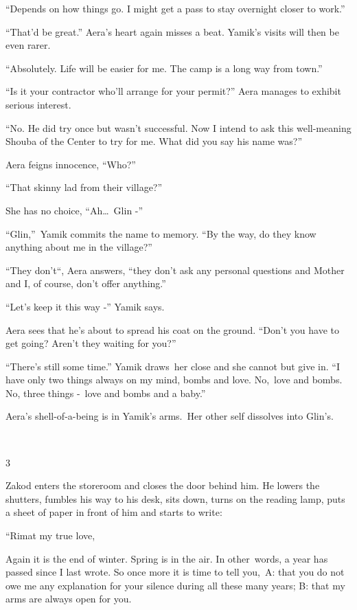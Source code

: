 \documentclass[twoside,11pt]{book}
\begin{document}
{}``Depends on how things go. I might get a pass to stay overnight closer to work.'' 

{}``That{}'d be great.'' Aera's heart again misses a beat. Yamik's visits will then be even rarer. 

{}``Absolutely. Life will be easier for me. The camp is a long way from town.'' 

{}``Is it your contractor who'll arrange for your permit?'' Aera manages to exhibit serious interest. 

{}``No. He did try once but wasn't successful. Now I intend to ask this well-meaning Shouba of the Center to try for me.
What did you say his name was?'' 

Aera feigns innocence, ``Who?''~ 

{}``That skinny lad from their village?'' 

She has no choice, ``Ah{\dots}\ Glin -{}'' 

{}``Glin,{}''\ Yamik commits the name to memory. ``By the way, do they know anything about me in the
village?''

``They don't``, Aera answers, ``they don't ask any personal questions and Mother
and I, of course, don't offer anything.''

``Let's keep it this way -'' Yamik says.

Aera sees that he's about to spread his coat on the ground. ``Don't you have to get going? Aren't they waiting for
you?'' 

{}``There's still some time.'' Yamik draws~her close and she cannot but give in. ``I have only two things always on my
mind, bombs and love. No,\ love and bombs. No, three things -\ love and bombs and a baby.'' 

Aera's shell-of-a-being is in Yamik's arms.{\ }Her other self dissolves into Glin's. 

~

3\ \ 

Zakod enters the storeroom and closes the door behind him. He lowers the shutters, fumbles his way to his desk, sits
down, turns on the reading lamp, puts a sheet of paper in front of him and starts to write:

{}``Rimat my true love,

Again it is the end of winter. Spring is in the air. In other\ words,  a year has passed since I last wrote. So once
more it is time to tell you,\ A: that you do not owe me any explanation for your silence during all these many years;
B: that my arms are always open for you.
\end{document}
